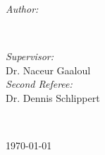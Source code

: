 \begin{titlepage}
\begin{minipage}{0.4\textwidth}
\begin{flushleft} \large
\emph{Author:}\\
\@author %
\end{flushleft}
\end{minipage}
~
\begin{minipage}{0.4\textwidth}
\begin{flushright} \large
\emph{Supervisor:} \\
Dr. Naceur Gaaloul \\[1.2em] %
\emph{Second Referee:} \\
Dr. Dennis Schlippert %
\end{flushright}
\end{minipage}\\[2cm]
\makeatother


{\large \today}\\[2cm] %

\vfill %

\end{titlepage}